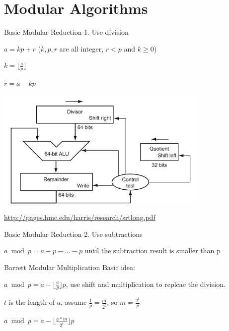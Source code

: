 \documentclass{beamer}
\begin{document}
\section{Modular Algorithms}
\begin{frame}{Basic Modular Reduction}
	1. Use \alert{division}

	$a = kp + r$ ($k,p,r$ are all integer, $r < p$ and $k \geq 0$)

	$k = \lfloor \frac{a}{p} \rfloor$

	$r = a - kp$

	\includegraphics[width=4in]{fig/division.png}

	\centering \alert{\url{http://pages.hmc.edu/harris/research/srtlong.pdf}}
\end{frame}

\begin{frame}{Basic Modular Reduction}
	2. Use \alert{subtractions}

	$a \bmod p = a - p - ... - p$ until the subtraction result is \alert{smaller} than p
\end{frame}

\begin{frame}{Barrett Modular Multiplication}
	Basic idea:

	$a \bmod p = a - \lfloor \frac{a}{p} \rfloor p$, use shift and multiplication to \alert{replcae} the division.

	\hspace*{\fill}

	$t$ is the length of $a$, assume $\frac{1}{p} = \frac{m}{2^t}$, so $m = \frac{2^t}{p}$

	$a \bmod p = a - \lfloor \frac{a*m}{2^t} \rfloor p$
\end{frame}
\end{document}
